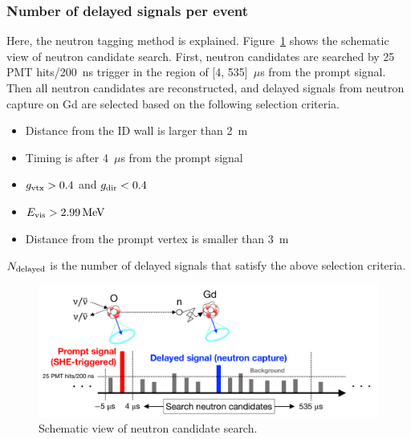 \subsubsection{Number of delayed signals per event}\label{Subsubsec_Ndelayed}
\vs\hs
Here, the neutron tagging method is explained.
Figure~\ref{Selection_neutron_tagging} shows the schematic view of neutron candidate search.
First, neutron candidates are searched by 25 PMT hits/200~ns trigger in the region of [4, 535]~$\mu$s from the prompt signal.
Then all neutron candidates are reconstructed, and delayed signals from neutron capture on Gd are selected based on the following selection criteria.
\begin{itemize}
	\item Distance from the ID wall is larger than 2~m
	\item Timing is after 4~$\mu$s from the prompt signal
	\item $g_{\rm vtx} > 0.4$ and $g_{\rm dir} < 0.4$
	\item $E_{\rm vis} > 2.99\,{\rm MeV}$
	\item Distance from the prompt vertex is smaller than 3~m
\end{itemize}
$N_{{\rm delayed}}$ is the number of delayed signals that satisfy the above selection criteria.

\begin{figure}[H]
	\centering
	\includegraphics[width=16cm]{Figures/Selection/neutron_tagging}
	\caption[Schematic view of neutron candidate search]{
	Schematic view of neutron candidate search.
	}\label{Selection_neutron_tagging}
\end{figure}

